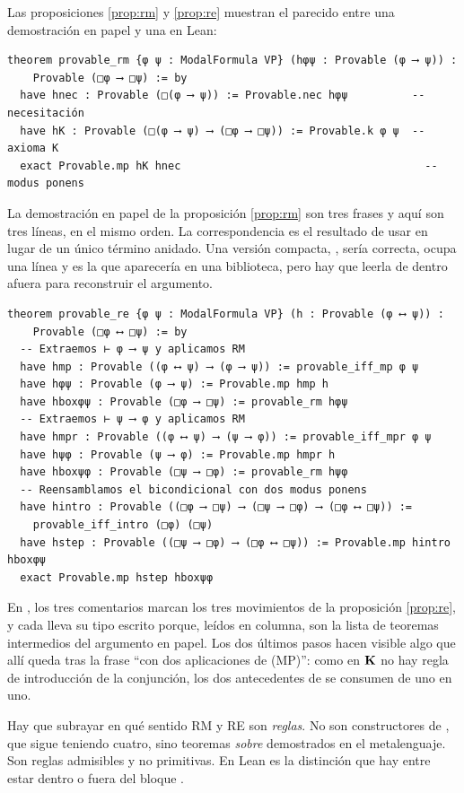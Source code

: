 Las proposiciones \ref{prop:rm} y \ref{prop:re} muestran el parecido entre una demostración en papel y una en Lean:

\begin{lstlisting}
theorem provable_rm {φ ψ : ModalFormula VP} (hφψ : Provable (φ ⟶ ψ)) :
    Provable (□φ ⟶ □ψ) := by
  have hnec : Provable (□(φ ⟶ ψ)) := Provable.nec hφψ          -- necesitación
  have hK : Provable (□(φ ⟶ ψ) ⟶ (□φ ⟶ □ψ)) := Provable.k φ ψ  -- axioma K
  exact Provable.mp hK hnec                                      -- modus ponens
\end{lstlisting}

La demostración en papel de la proposición \ref{prop:rm} son tres frases y aquí son tres líneas, en el mismo orden. La correspondencia es el resultado de usar  en lugar de un único término anidado. Una versión compacta, , sería correcta, ocupa una línea y es la que aparecería en una biblioteca, pero hay que leerla de dentro afuera para reconstruir el argumento.

\begin{lstlisting}
theorem provable_re {φ ψ : ModalFormula VP} (h : Provable (φ ⟷ ψ)) :
    Provable (□φ ⟷ □ψ) := by
  -- Extraemos ⊢ φ ⟶ ψ y aplicamos RM
  have hmp : Provable ((φ ⟷ ψ) ⟶ (φ ⟶ ψ)) := provable_iff_mp φ ψ
  have hφψ : Provable (φ ⟶ ψ) := Provable.mp hmp h
  have hboxφψ : Provable (□φ ⟶ □ψ) := provable_rm hφψ
  -- Extraemos ⊢ ψ ⟶ φ y aplicamos RM
  have hmpr : Provable ((φ ⟷ ψ) ⟶ (ψ ⟶ φ)) := provable_iff_mpr φ ψ
  have hψφ : Provable (ψ ⟶ φ) := Provable.mp hmpr h
  have hboxψφ : Provable (□ψ ⟶ □φ) := provable_rm hψφ
  -- Reensamblamos el bicondicional con dos modus ponens
  have hintro : Provable ((□φ ⟶ □ψ) ⟶ (□ψ ⟶ □φ) ⟶ (□φ ⟷ □ψ)) :=
    provable_iff_intro (□φ) (□ψ)
  have hstep : Provable ((□ψ ⟶ □φ) ⟶ (□φ ⟷ □ψ)) := Provable.mp hintro hboxφψ
  exact Provable.mp hstep hboxψφ
\end{lstlisting}

En , los tres comentarios marcan los tres movimientos de la proposición \ref{prop:re}, y cada  lleva su tipo escrito porque, leídos en columna, son la lista de teoremas intermedios del argumento en papel. Los dos últimos pasos hacen visible algo que allí queda tras la frase ``con dos aplicaciones de (MP)'': como en $\mathbf{K}$ no hay regla de introducción de la conjunción, los dos antecedentes de  se consumen de uno en uno.

Hay que subrayar en qué sentido RM y RE son \emph{reglas}. No son constructores de , que sigue teniendo cuatro, sino teoremas \emph{sobre}  demostrados en el metalenguaje. Son reglas admisibles y no primitivas. En Lean es la distinción que hay entre estar dentro o fuera del bloque .

